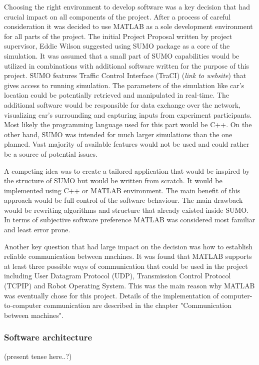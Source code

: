 \documentclass[11pt,english]{article}
\begin{document}
Choosing the right environment to develop software was a key decision that had crucial impact on all components of the project. After a process of careful consideration it was decided to use MATLAB as a sole development environment for all parts of the project. The initial Project Proposal written by project supervisor, Eddie Wilson suggested using SUMO package as a core of the simulation. It was assumed that a small part of SUMO capabilities would be utilized in combinations with additional software written for the purpose of this project. SUMO features  Traffic Control Interface (TraCI) (\textit{link to website}) that gives access to running simulation. The parameters of the simulation like car's location could be potentially retrieved and manipulated in real-time. The additional software would be responsible for data exchange over the network, visualizing car's surrounding and capturing inputs from experiment participants. Most likely the programming language used for this part would be C++. On the other hand, SUMO was intended for much larger simulations than the one planned. Vast majority of available features would not be used and could rather be a source of potential issues. 

A competing idea was to create a tailored application that would be inspired by the structure of SUMO but would be written from scratch. It would be implemented using C++ or MATLAB environment. The main benefit of this approach would be full control of the software behaviour. The main drawback would be rewriting algorithms and structure that already existed inside SUMO. In terms of subjective software preference MATLAB was considered most familiar and least error prone.  

Another key question that had large impact on the decision was how to establish reliable communication between machines. 
It was found that MATLAB supports at least three possible ways of communication that could be used in the project including User Datagram Protocol (UDP), Transmission Control Protocol (TCPIP) and Robot Operating System. This was the main reason why MATLAB was eventually chose for this project.
Details of the implementation of computer-to-computer communication are described in the chapter "Communication between machines".

\subsubsection{Software architecture}
(present tense here..?)
\end{document}
